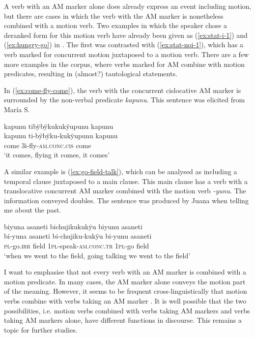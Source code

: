 A verb with an AM marker alone does already express an event including motion, but there are cases in which the verb with the AM marker is nonetheless combined with a motion verb. Two examples in which the speaker chose a deranked form for this motion verb have already been given as  (\ref{ex:stat-i-1}) and (\ref{ex:hungry-go}) in . The first was contrasted with (\ref{ex:stat-noi-1}), which has a verb marked for concurrent motion juxtaposed to a motion verb. There are a few more examples in the corpus, where verbs marked for AM combine with motion predicates, resulting in (almost?) tautological statements.

In (\ref{ex:come-fly-come}), the verb with the concurrent cislocative AM marker is surrounded by the non-verbal predicate \textit{kapunu}. This sentence was elicited from María S.

\ea\label{ex:come-fly-come}
\begingl
\glpreamble kapunu tibÿbÿkukukÿupunu kapunu\\
\gla kapunu ti-bÿbÿku-kukÿupunu kapunu\\
\glb come 3i-fly-\textsc{am.conc.cis} come\\
\glft ‘it comes, flying it comes, it comes’
\endgl
\trailingcitation{[rmx-e150922l.062]}
\xe

A similar example is (\ref{ex:go-field-talk}), which can be analysed as including a temporal clause juxtaposed to a main clause. This main clause has a verb with a translocative concurrent AM marker combined with the motion verb \textit{-yunu}. The information conveyed doubles. The sentence was produced by Juana when telling me about the past.

\ea\label{ex:go-field-talk}
\begingl
\glpreamble biyuna asaneti bichujikukukÿu biyunu asaneti\\
\gla bi-yuna asaneti bi-chujiku-kukÿu bi-yunu asaneti\\
\textsc{pl}-go.\textsc{irr} field 1\textsc{pl}-speak-\textsc{am.conc.tr} 1\textsc{pl}-go field\\
\glft ‘when we went to the field, going talking we went to the field’
\endgl
\trailingcitation{[jxx-p120515l-1.168]}
\xe

I want to emphasise that not every verb with an AM marker is combined with a motion predicate. In many cases, the AM marker alone conveys the motion part of the meaning. However, it seems to be frequent cross-linguistically that motion verbs combine with verbs taking an AM marker \citep[128]{Rose2015}. It is well possible that the two possibilities, i.e. motion verbs combined with verbs taking AM markers and verbs taking AM markers alone, have different functions in discourse. This remains a topic for further studies.

